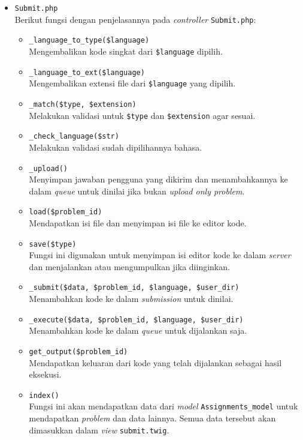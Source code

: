 \begin{itemize}
\begin{itemize}
	\item \verb|Submit.php| \\
	      Berikut fungsi dengan penjelasannya pada \textit{controller} \verb|Submit.php|:

	      \begin{itemize}
		      \item \verb|_language_to_type($language)| \\
		            Mengembalikan kode singkat dari \verb|$language| dipilih.
		      \item \verb|_language_to_ext($language)| \\
		            Mengembalikan extensi file dari \verb|$language| yang dipilih.
		      \item \verb|_match($type, $extension)| \\
		            Melakukan validasi untuk \verb|$type| dan \verb|$extension| agar sesuai.
		      \item \verb|_check_language($str)| \\
		            Melakukan validasi sudah dipilihannya bahasa.
		      \item \verb|_upload()| \\
		            Menyimpan jawaban pengguna yang dikirim dan menambahkannya ke dalam \textit{queue} untuk dinilai jika bukan \textit{upload only problem}.
		      \item \verb|load($problem_id)| \\
		            Mendapatkan isi file dan menyimpan isi file ke editor kode.
		      \item \verb|save($type)| \\
		            Fungsi ini digunakan untuk menyimpan isi editor kode ke dalam \textit{server} dan menjalankan atau mengumpulkan jika diinginkan.
		      \item \verb|_submit($data, $problem_id, $language, $user_dir)| \\
		            Menambahkan kode ke dalam \textit{submission} untuk dinilai.
		      \item \verb|_execute($data, $problem_id, $language, $user_dir)| \\
		            Menambahkan kode ke dalam \textit{queue} untuk dijalankan saja.
		      \item \verb|get_output($problem_id)| \\
		            Mendapatkan keluaran dari kode yang telah dijalankan sebagai hasil eksekusi.
		      \item \verb|index()| \\
		            Fungsi ini akan mendapatkan data dari \textit{model} \verb|Assignments_model| untuk mendapatkan \textit{problem} dan data lainnya. Semua data tersebut akan dimasukkan dalam \textit{view} \verb|submit.twig|. 


\end{itemize}
\end{itemize}
\end{itemize}
